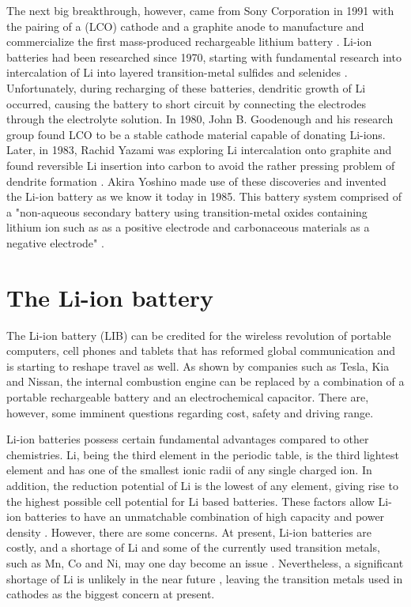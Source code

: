 \documentclass[Main/main.tex]{subfiles}
\begin{document}
The next big breakthrough, however, came from Sony Corporation in 1991 with the pairing of a  (LCO) cathode and a graphite anode to manufacture and commercialize the first mass-produced rechargeable lithium battery \cite{1_hist}. Li-ion batteries had been researched since 1970, starting with fundamental research into intercalation of Li into layered transition-metal sulfides and selenides \cite{Goodenough2013}. Unfortunately, during recharging of these batteries, dendritic growth of Li occurred, causing the battery to short circuit by connecting the electrodes through the electrolyte solution.
In 1980, John B. Goodenough and his research group found LCO to be a stable cathode material capable of donating Li-ions. Later, in 1983, Rachid Yazami was exploring Li intercalation onto graphite and found reversible Li insertion into carbon to avoid the rather pressing problem of dendrite formation \cite{1_LIB_birth} \cite{1_yazami}. Akira Yoshino made use of these discoveries and invented the Li-ion battery as we know it today in 1985. This battery system comprised of a "non-aqueous secondary battery using transition-metal oxides containing lithium ion such as  as a positive electrode and carbonaceous materials as a negative electrode" \cite{1_LIB_birth}.



\section{The Li-ion battery}

The Li-ion battery (LIB) can be credited for the wireless revolution of portable computers, cell phones and tablets that has reformed global communication and is starting to reshape travel as well. As shown by companies such as Tesla, Kia and Nissan, the internal combustion engine can be replaced by a combination of a portable rechargeable battery and an electrochemical capacitor.
There are, however, some imminent questions regarding cost, safety and driving range.  

Li-ion batteries possess certain fundamental advantages compared to other chemistries. Li, being the third element in the periodic table, is the third lightest element and has one of the smallest ionic radii of any single charged ion. In addition, the reduction potential of Li is the lowest of any element, giving rise to the highest possible cell potential for Li based batteries. These factors allow Li-ion batteries to have an unmatchable combination of high capacity and power density \cite{1_rev_liion}. However, there are some concerns. At present, Li-ion batteries are costly, and a shortage of Li and some of the currently used transition metals, such as Mn, Co and Ni, may one day become an issue \cite{VIKSTROM}. Nevertheless, a significant shortage of Li is unlikely in the near future \cite{Gruber, Speirs}, leaving the transition metals used in cathodes as the biggest concern at present.
\end{document}
